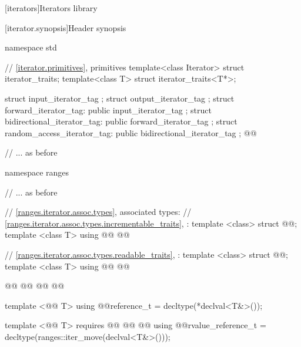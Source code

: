 \setcounter{chapter}{26}
[iterators]{Iterators library}

\setcounter{section}{1}
[iterator.synopsis]{Header  synopsis}

%
\begin{codeblock}
namespace std {
  // \ref{iterator.primitives}, primitives
  template<class Iterator> struct iterator_traits;
  template<class T> struct iterator_traits<T*>;

  struct input_iterator_tag { };
  struct output_iterator_tag { };
  struct forward_iterator_tag: public input_iterator_tag { };
  struct bidirectional_iterator_tag: public forward_iterator_tag { };
  struct random_access_iterator_tag: public bidirectional_iterator_tag { };
  @@

  // ... as before

  namespace ranges {
    // ... as before

    // \ref{ranges.iterator.assoc.types}, associated types:
    // \ref{ranges.iterator.assoc.types.incrementable_traits}, :
    template <class> struct @@;
    template <class T> using @@
      @@

    // \ref{ranges.iterator.assoc.types.readable_traits}, :
    template <class> struct @@;
    template <class T> using @@
      @@

    @@
    @@
    @@
      @@

    template <@@ T> using @@reference_t
      = decltype(*declval<T&>());

    template <@@ T>
        requires @@
          @@
        @\added{\}}@
    using @@rvalue_reference_t
      = decltype(ranges::iter_move(declval<T&>()));

}}
\end{codeblock}
